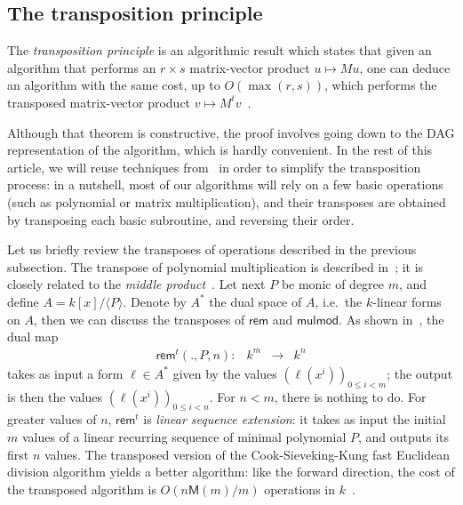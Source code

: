 \documentclass{sig-alternate}
\def\M {\ensuremath{\mathsf{M}}}
\def\rem {\ensuremath{\mathsf{rem}}}
\def\mulmod {\ensuremath{\mathsf{mulmod}}}
\newcounter{algo}
\newcommand{\ang}[1]{\langle#1\rangle}
\begin{document}

\subsection{The transposition principle}
\label{sec:algor-dual-basis}

The {\em transposition principle} is an algorithmic result which
states that given an algorithm that performs an $r \times s$
matrix-vector product $u \mapsto M u$, one can deduce an algorithm
with the same cost, up to $O(\max(r,s))$, which performs the
transposed matrix-vector product $v \mapsto M^t
v$~\cite[Ch.~13]{burgisser+clausen-shokrollahi}.

Although that theorem is constructive, the proof involves going down
to the DAG representation of the algorithm, which is hardly
convenient.  In the rest of this article, we will reuse techniques
from~\cite{bostan+lecerf+schost:tellegen} in order to simplify the
transposition process: in a nutshell, most of our algorithms will rely
on a few basic operations (such as polynomial or matrix
multiplication), and their transposes are obtained by transposing each
basic subroutine, and reversing their order.

Let us briefly review the transposes of operations described in the
previous subsection. The transpose of polynomial multiplication is
described in~\cite{bostan+lecerf+schost:tellegen}; it is closely
related to the {\em middle product}~\cite{hanrot+quercia+zimmermann}.
Let next $P$ be monic of degree $m$, and define
$A=k[x]/\ang{P}$. Denote by $A^\ast$ the dual space of $A$, i.e.\ the
$k$-linear forms on $A$, then we can discuss the transposes of
$\rem$ and $\mulmod$. As shown
in~\cite{bostan+lecerf+schost:tellegen}, the dual map
$$
\begin{array}{cccc}
\rem^t(.,P,n): &k^m& \to &k^n
\end{array}$$ 
takes as input a form $\ell\in A^\ast$ given by the values
$(\ell(x^i))_{0 \le i < m}$; the output is then the values
$(\ell(x^i))_{0 \le i < n}$. For $n < m$, there is nothing to do. For
greater values of $n$, $\rem^t$ is \emph{linear sequence extension}:
it takes as input the initial $m$ values of a linear recurring
sequence of minimal polynomial $P$, and outputs its first $n$ values.
The transposed version of the Cook-Sieveking-Kung fast
Euclidean division algorithm yields a better algorithm: like the
forward direction, the cost of the transposed algorithm is
$O(n\M(m)/m)$ operations in $k$~\cite{vzgathen+shoup92:journal,shoup99}.
\end{document}
